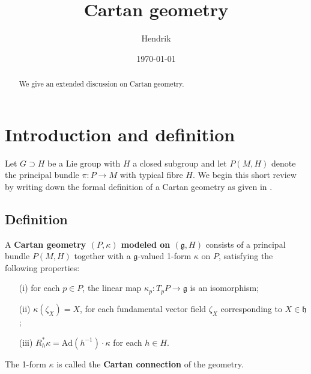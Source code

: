 \documentclass[11pt]{article}
\title{Cartan geometry}
\author{Hendrik}
\date{\today}
\begin{document}
\maketitle

\begin{abstract}
	We give an extended discussion on Cartan geometry.
\end{abstract}

\section{Introduction and definition}

{
}

Let $G \supset H$ be a Lie group with $H$ a closed subgroup and 
let $P(M,H)$ denote the principal bundle $\pi : P \to M$ with 
typical fibre $H$. We begin this short review by writing down the 
formal definition of a Cartan geometry as given in 
\cite{sharpe1997diff_geo}.

\subsection{Definition}

\begin{definition}
	\label{def:cartan_geo}
	A \textbf{Cartan geometry $(P,\kappa)$ modeled on 		
		$(\mathfrak{g},H)$} consists of a principal bundle $P(M,H)$ 
	together with a $\mathfrak{g}$-valued 1-form $\kappa$ on $P$, 
	satisfying the following properties:
	\begin{itemize}
		\item[(i)] for each $p \in P$, the linear map $\kappa_p : 
			T_pP \to \mathfrak{g}$ is an isomorphism;
		\item[(ii)] $\kappa(\zeta_X) = X$, for each fundamental 
			vector field $\zeta_X$ corresponding to $X \in 
			\mathfrak{h}$;
		\item[(iii)] $R_h^\ast \kappa = \mathrm{Ad}(h^{-1}) \cdot 
			\kappa$ for each $h \in H$.
	\end{itemize}
	The 1-form $\kappa$ is called the \textbf{Cartan connection} of 
	the geometry.
\end{definition}
\end{document}
